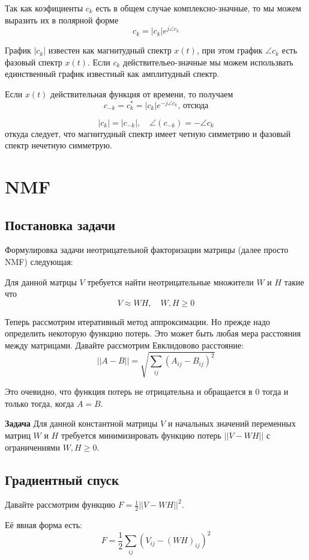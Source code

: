 \documentclass[oneside, final, 14pt]{extarticle}
\begin{document}
  Так как коэфициенты $c_k$ есть в общем случае комплексно-значные,
  то мы можем выразить их в полярной форме
  \[
    c_k = |c_k| e^{j\angle c_k}
  \]

  График $|c_k|$ известен как магнитудный спектр $x(t)$,
  при этом график $\angle c_k$ есть фазовый спектр $x(t)$.
  Если $c_k$ действительео-значные мы можем использвать единственный
  график известный как амплитудный спектр.

  Если $x(t)$ действительная функция от времени, то получаем
  \[
    c_{-k} = c_k^* = |c_k| e^{-j\angle c_k} \text{, отсюда}
  \]

  \[
    |c_k| = |c_{-k}|, \quad \angle (c_{-k}) = -\angle c_k
  \]
  откуда следует, что магнитудный спектр имеет четную симметрию
  и фазовый спектр нечетную симметрую.

\section{NMF}

\subsection{Постановка задачи}

Формулировка задачи неотрицательной факторизации матрицы (далее просто NMF)
следующая:

Для данной матрцы $V$ требуется найти неотрицательные множители $W$ и $H$
такие что
\[
  V \approx WH, \quad W,H \geqslant 0
\]

Теперь рассмотрим итеративный метод аппроксимации.
Но прежде надо определить некоторую функцию потерь.
Это может быть любая мера расстояния между матрицами.
Давайте рассмотрим Евклидовово расстояние:
\[
  ||A - B|| = \sqrt{\sum_{ij} (A_{ij} - B_{ij})^2}
\]

Это очевидно, что функция потерь не отрицательна
и обращается в 0 тогда и только тогда, когда $A = B$.

\textbf{Задача} Для данной константной матрицы $V$
и начальных значений переменных матриц $W$ и $H$
требуется минимизировать функцию потерь $||V-WH||$
с ограничениями $W,H \geqslant 0$.

\subsection{Градиентный спуск}
Давайте рассмотрим функцию $F = \frac{1}{2}||V - WH||^2$.

Её явная форма есть:
\[
  F = \frac{1}{2} \sum_{ij}
  \left(
    V_{ij} - (WH)_{ij}
  \right)^2
\]
\end{document}
